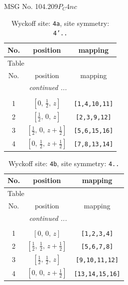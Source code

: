 \documentclass[fleqn,8pt]{jsarticle}
\begin{document}
\setcounter{MaxMatrixCols}{32}

\renewcommand{\tablename}{Table~}
\renewcommand{\figurename}{Figure~}
\begin{center}
\LARGE
MSG No. 104.209\quad$P_{C}4nc$
\end{center}
\renewcommand{\arraystretch}{1.2}
\begin{longtable}{ccc}
\caption{Wyckoff site: {\tt 4a}, site symmetry: {\tt 4'..}}
 \\
 \hline \hline
No. & position & mapping \\ \hline \endfirsthead

\multicolumn{2}{l}{\tablename\ \thetable{}} \\
 \hline \hline
No. & position & mapping \\ \hline \endhead

 \hline \hline
\multicolumn{2}{r}{\footnotesize\it continued ...} \\ \endfoot

 \hline \hline
\multicolumn{2}{r}{} \\ \endlastfoot

1 & $\left[ 0,\, \frac{1}{2},\, z \right]$ & {\tt [1,4,10,11]} \\ \hline
2 & $\left[ \frac{1}{2},\, 0,\, z \right]$ & {\tt [2,3,9,12]} \\ \hline
3 & $\left[ \frac{1}{2},\, 0,\, z + \frac{1}{2} \right]$ & {\tt [5,6,15,16]} \\ \hline
4 & $\left[ 0,\, \frac{1}{2},\, z + \frac{1}{2} \right]$ & {\tt [7,8,13,14]} \\
\end{longtable}
\renewcommand{\arraystretch}{1.2}
\begin{longtable}{ccc}
\caption{Wyckoff site: {\tt 4b}, site symmetry: {\tt 4..}}
 \\
 \hline \hline
No. & position & mapping \\ \hline \endfirsthead

\multicolumn{2}{l}{\tablename\ \thetable{}} \\
 \hline \hline
No. & position & mapping \\ \hline \endhead

 \hline \hline
\multicolumn{2}{r}{\footnotesize\it continued ...} \\ \endfoot

 \hline \hline
\multicolumn{2}{r}{} \\ \endlastfoot

1 & $\left[ 0,\, 0,\, z \right]$ & {\tt [1,2,3,4]} \\ \hline
2 & $\left[ \frac{1}{2},\, \frac{1}{2},\, z + \frac{1}{2} \right]$ & {\tt [5,6,7,8]} \\ \hline
3 & $\left[ \frac{1}{2},\, \frac{1}{2},\, z \right]$ & {\tt [9,10,11,12]} \\ \hline
4 & $\left[ 0,\, 0,\, z + \frac{1}{2} \right]$ & {\tt [13,14,15,16]} \\
\end{longtable}
\end{document}
